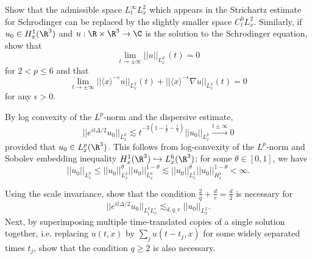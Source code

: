 \begin{solution}
	
\end{solution}

\begin{statement} Show that the admissible space $L^\infty_t L^2_x$ which appears in the Strichartz estimate for Schrodinger can be replaced by the slightly smaller space $C^0_t L^2_x$. Similarly, if $u_0 \in H^1_x (\R^3)$ and $u: \R \times \R^3 \to \C$ is the solution to the Schrodinger equation, show that 
	\[ \lim_{t \to \pm \infty} ||u||_{L^{p'}_x} (t) = 0 \]
	for $2 < p \leq 6$ and that 
		\[ \lim_{t \to \pm \infty} || \langle  x \rangle^{-\epsilon} u||_{L^2_x} (t) + || \langle x \rangle^{-\epsilon} \nabla u||_{L^2_x} (t) = 0 \]
	for any $\epsilon > 0$. 	

\end{statement}


\begin{solution}
	By log convexity of the $L^p$-norm and the dispersive estimate, 
		\[ ||e^{it \Delta/2} u_0||_{L^p_x}  \lesssim t^{-3 (1 - \frac1p - \frac12)} ||u_0||_{L^{p}_x} \overset{t \pm \infty}{\longrightarrow} 0\]
	provided that $u_0 \in L^p_x (\R^3)$. This follows from log-convexity of the $L^p$-norm and Sobolev embedding inequality $H^1_x (\R^3) \hookrightarrow L^6_x (\R^3)$; for some $\theta \in [0, 1]$, we have
		\[ ||u_0||_{L^p_x} \leq || u_0||_{L^{2}_x}^\theta ||u_0||_{L^6_x}^{1 - \theta} \lesssim ||u_0||_{L^2_x}^\theta ||u_0||_{H^1_x}^{1 - \theta} < \infty. \]
	
	
\end{solution}



\begin{statement}
	Using the scale invariance, show that the condition $\frac2q + \frac{d}{r} = \frac{d}{2}$ is necessary for
		\[ ||e^{it \Delta/2} u_0||_{L^q_t L^r_x} \lesssim_{d, q, r} ||u_0||_{L^2_x}. \]
	Next, by superimposing multiple time-translated copies of a single solution together, i.e. replacing $u(t, x)$ by $\sum_j u(t - t_j, x)$ for some widely separated times $t_j$, show that the condition $q \geq 2$ is also necessary. 	
\end{statement}


